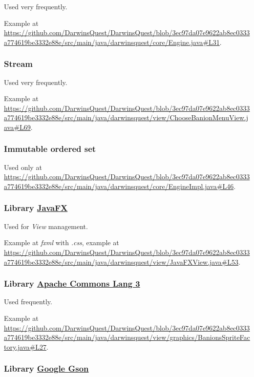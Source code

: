 \documentclass[12pt, a4paper]{report}
\theoremstyle{definition}
\begin{document}
        Used very frequently.

        Example at \url{https://github.com/DarwinsQuest/DarwinsQuest/blob/3ec97da07e9622ab8ec0333a774619be3332e88e/src/main/java/darwinsquest/core/Engine.java#L31}.

        \subsubsection{Stream}

        Used very frequently.

        Example at \url{https://github.com/DarwinsQuest/DarwinsQuest/blob/3ec97da07e9622ab8ec0333a774619be3332e88e/src/main/java/darwinsquest/view/ChooseBanionMenuView.java#L69}.

        \subsubsection{Immutable ordered set}

        Used only at \url{https://github.com/DarwinsQuest/DarwinsQuest/blob/3ec97da07e9622ab8ec0333a774619be3332e88e/src/main/java/darwinsquest/core/EngineImpl.java#L46}.

        \subsubsection{Library \href{https://openjfx.io/}{JavaFX}}
        
        Used for \emph{View} management.

        Example at \textit{fxml} with \textit{.css}, example at \url{https://github.com/DarwinsQuest/DarwinsQuest/blob/3ec97da07e9622ab8ec0333a774619be3332e88e/src/main/java/darwinsquest/view/JavaFXView.java#L53}.
        
        \subsubsection{Library \href{https://commons.apache.org/proper/commons-lang/}{Apache Commons Lang 3}}
        
        Used frequently.

        Example at \url{https://github.com/DarwinsQuest/DarwinsQuest/blob/3ec97da07e9622ab8ec0333a774619be3332e88e/src/main/java/darwinsquest/view/graphics/BanionsSpriteFactory.java#L27}.
        
        \subsubsection{Library \href{https://github.com/google/gson}{Google Gson}}
        
\end{document}
